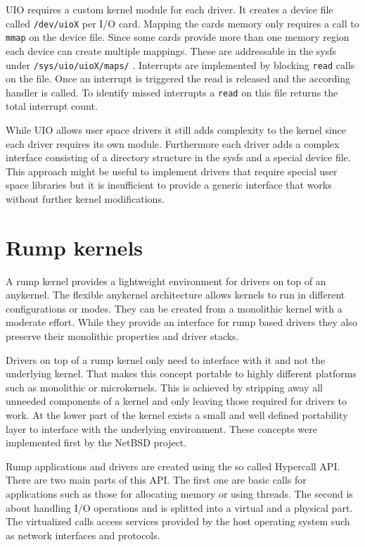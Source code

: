 \documentclass[
a4paper,
11pt,
twoside
]{report}
\begin{document}
		UIO requires a custom kernel module for each driver.
		It creates a device file called \texttt{/dev/uioX} per I/O card.
		Mapping the cards memory only requires a call to \texttt{mmap} on the device file.
		Since some cards provide more than one memory region each device can create multiple mappings.
		These are addressable in the sysfs \citep{sysfs} under \texttt{/sys/uio/uioX/maps/} \citep{uio}.
		Interrupts are implemented by blocking \texttt{read} calls on the file.
		Once an interrupt is triggered the read is released and the according handler is called.
		To identify missed interrupts a \texttt{read} on this file returns the total interrupt count. \citep{uio}
		
		While UIO allows user space drivers it still adds complexity to the kernel since each driver requires its own module.
		Furthermore each driver adds a complex interface consisting of a directory structure in the sysfs and a special device file.
		This approach might be useful to implement drivers that require special user space libraries but it is insufficient to provide a generic interface that works without further kernel modifications.
		
		\section{Rump kernels}
		
		A rump kernel provides a lightweight environment for drivers on top of an anykernel.
		The flexible anykernel architecture allows kernels to run in different configurations or modes.
		They can be created from a monolithic kernel with a moderate effort.
		While they provide an interface for rump based drivers they also preserve their monolithic properties and driver stacks. \citep{kantee}
		
		Drivers on top of a rump kernel only need to interface with it and not the underlying kernel.
		That makes this concept portable to highly different platforms such as monolithic or microkernels.
		This is achieved by stripping away all unneeded components of a kernel and only leaving those required for drivers to work.
		At the lower part of the kernel exists a small and well defined portability layer to interface with the underlying environment.
		These concepts were implemented first by the NetBSD project. \citep{bsd_rump}\citep{fosdem_rump}\citep{rump}
		
		Rump applications and drivers are created using the so called Hypercall API.
		There are two main parts of this API.
		The first one are basic calls for applications such as those for allocating memory or using threads.
		The second is about handling I/O operations and is splitted into a virtual and a physical part.
		The virtualized calls access services provided by the host operating system such as network interfaces and protocols. \citep{rump_man} \citep{rump_platform}
		
\end{document}
